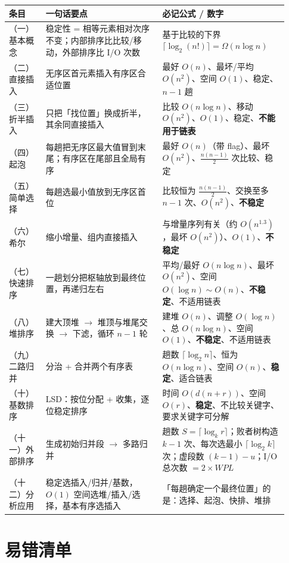 \documentclass[11pt,openany,UTF8]{ctexbook}
\begin{document}
\begingroup\small\setlength{\tabcolsep}{4.0pt}
\begin{longtable}{@{}L{0.1280\linewidth}L{0.3840\linewidth}L{0.4164\linewidth}@{}}
\toprule
\textbf{条目} & \textbf{一句话要点} & \textbf{必记公式 / 数字} \\
\midrule
\endhead
（一）基本概念 & 稳定性 = 相等元素相对次序不变；内部排序比比较/移动，外部排序比 I/O 次数 & 基于比较的下界 $\lceil\log_2(n!)\rceil=\Omega(n\log n)$ \\
（二）直接插入 & 无序区首元素插入有序区合适位置 & 最好 $O(n)$、最坏/平均 $O(n^2)$、空间 $O(1)$、稳定、$n-1$ 趟 \\
（三）折半插入 & 只把「找位置」换成折半，其余同直接插入 & 比较 $O(n\log n)$、移动 $O(n^2)$、$O(1)$、稳定、\textbf{不能用于链表} \\
（四）起泡 & 每趟把无序区最大值冒到末尾；有序区在尾部且全局有序 & 最好 $O(n)$（带 flag）、最坏 $O(n^2)$、$\frac{n(n-1)}{2}$ 次比较、稳定 \\
（五）简单选择 & 每趟选最小值放到无序区首位 & 比较恒为 $\frac{n(n-1)}{2}$、交换至多 $n-1$ 次、$O(n^2)$、\textbf{不稳定} \\
（六）希尔 & 缩小增量、组内直接插入 & 与增量序列有关（约 $O(n^{1.3})$，最坏 $O(n^2)$）、$O(1)$、\textbf{不稳定} \\
（七）快速排序 & 一趟划分把枢轴放到最终位置，再递归左右 & 平均/最好 $O(n\log n)$、最坏 $O(n^2)$、空间 $O(\log n)\sim O(n)$、\textbf{不稳定}、不适用链表 \\
（八）堆排序 & 建大顶堆 $\to$ 堆顶与堆尾交换 $\to$ 下滤，循环 $n-1$ 轮 & 建堆 $O(n)$、调整 $O(\log n)$、总 $O(n\log n)$、空间 $O(1)$、\textbf{不稳定}、不适用链表 \\
（九）二路归并 & 分治 + 合并两个有序表 & 趟数 $\lceil\log_2 n\rceil$、恒为 $O(n\log n)$、空间 $O(n)$、\textbf{稳定}、适合链表 \\
（十）基数排序 & LSD：按位分配 + 收集，逐位稳定排序 & 时间 $O(d(n+r))$、空间 $O(r)$、\textbf{稳定}、不比较关键字、要求关键字可分解 \\
（十一）外部排序 & 生成初始归并段 $\to$ 多路归并 & 趟数 $S=\lceil\log_k r\rceil$；败者树构造 $k-1$ 次、每次选最小 $\lceil\log_2 k\rceil$ 次；虚段数 $(k-1)-u$；I/O 总次数 $=2\times WPL$ \\
（十二）分析应用 & 稳定选插入/归并/基数，$O(1)$ 空间选堆/插入/选择，基本有序选插入 & 「每趟确定一个最终位置」的是：选择、起泡、快排、堆排 \\
\bottomrule
\end{longtable}
\endgroup

\section*{易错清单}
\end{document}
